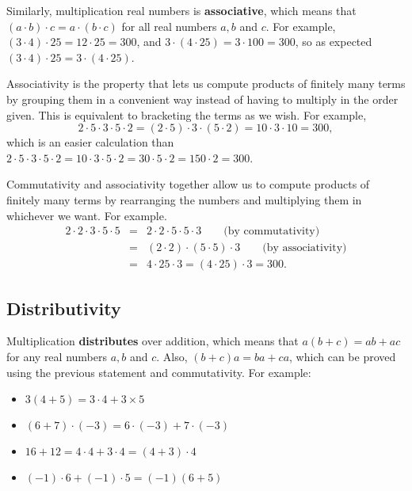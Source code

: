 \documentclass[11pt]{book}               %
\begin{document}
Similarly, multiplication real numbers is \textbf{associative}, 
which means that $(a \cdot b) \cdot c = a \cdot (b \cdot c)$ for all real numbers $a, b$ and $c$.
For example, 
$(3\cdot4)\cdot25 = 12\cdot 25 = 300$, and $3\cdot(4\cdot25)=3\cdot100=300$, so as expected $(3\cdot4)\cdot25 = 3\cdot(4\cdot25)$.

Associativity is the property that lets us compute products of finitely many terms by grouping them in a convenient way instead of having to multiply in the order given.
This is equivalent to bracketing the terms as we wish.
For example,
$$2 \cdot 5 \cdot 3 \cdot 5 \cdot 2 = (2 \cdot 5) \cdot 3 \cdot (5 \cdot 2) = 10 \cdot 3 \cdot 10 = 300,$$
which is an easier calculation than $2 \cdot 5 \cdot 3 \cdot 5 \cdot 2 =10\cdot 3 \cdot 5 \cdot 2 = 30 \cdot 5 \cdot 2 = 150 \cdot 2 = 300$.

Commutativity and associativity together allow us to compute products of finitely many terms by rearranging the
numbers and multiplying them in whichever we want.  For example.
\begin{eqnarray*}
2 \cdot 2 \cdot 3 \cdot 5 \cdot 5 &=& 2 \cdot 2 \cdot 5 \cdot 5 \cdot 3 \quad\quad \mbox{(by commutativity)}\\
& = & (2 \cdot 2) \cdot (5 \cdot 5) \cdot 3 \quad\quad \mbox{(by associativity)}\\
& = & 4 \cdot 25 \cdot 3 = (4 \cdot 25) \cdot 3  = 300.
\end{eqnarray*}

 
 \subsection{Distributivity}

Multiplication \textbf{distributes} over addition, which means that $a (b + c) = ab + a c$ for any real numbers $a, b$ and $c$.
Also, $(b + c) a = ba + ca$, which can be proved using the previous statement and commutativity.
For example:
\begin{itemize}
\item $3(4 + 5) = 3 \cdot 4 + 3 \times 5$
\item $(6 + 7) \cdot (-3) = 6 \cdot (-3) + 7 \cdot (-3)$
\item $16 + 12 = 4 \cdot 4 + 3 \cdot 4 = (4 + 3) \cdot 4$
\item $(-1)\cdot 6 + (-1) \cdot 5 = (-1)(6 + 5)$
\end{itemize}
\end{document}
